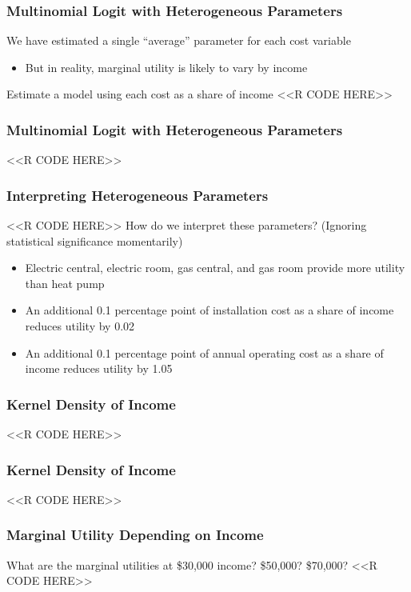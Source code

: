 \documentclass{beamer}
\begin{document}
\begin{frame}[fragile]\frametitle{Multinomial Logit with Heterogeneous Parameters}
    We have estimated a single ``average'' parameter for each cost variable
    \begin{itemize}
        \item But in reality, marginal utility is likely to vary by income
    \end{itemize}
    \vspace{2ex}
    Estimate a model using each cost as a share of income
    <<R CODE HERE>>
\end{frame}

\begin{frame}[fragile]\frametitle{Multinomial Logit with Heterogeneous Parameters}
    <<R CODE HERE>>
\end{frame}

\begin{frame}[fragile]\frametitle{Interpreting Heterogeneous Parameters}
    <<R CODE HERE>>
    \vspace{1ex}
    How do we interpret these parameters? (Ignoring statistical significance momentarily)
    \begin{itemize}
        \item Electric central, electric room, gas central, and gas room provide more utility than heat pump
        \item An additional 0.1 percentage point of installation cost as a share of income reduces utility by 0.02
        \item An additional 0.1 percentage point of annual operating cost as a share of income reduces utility by 1.05
    \end{itemize}
\end{frame}

\begin{frame}[fragile]\frametitle{Kernel Density of Income}
    <<R CODE HERE>>
\end{frame}

\begin{frame}[fragile]\frametitle{Kernel Density of Income}
    <<R CODE HERE>>
\end{frame}

\begin{frame}[fragile]\frametitle{Marginal Utility Depending on Income}
    What are the marginal utilities at \$30,000 income? \$50,000? \$70,000?
    <<R CODE HERE>>
\end{frame}
\end{document}
